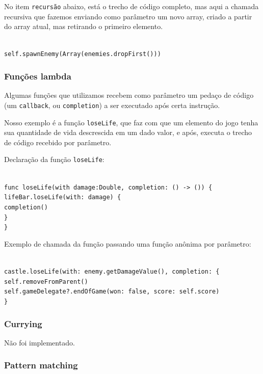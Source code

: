 \documentclass[rel_mlp]{iiufrgs}
\newcommand\tab[1][1cm]{\hspace*{#1}}
\begin{document}
No item \texttt{recursão} abaixo, está o trecho de código completo, mas aqui a chamada recursiva que fazemos enviando como parâmetro um novo array, criado a partir do array atual, mas retirando o primeiro elemento.

\texttt{
\\self.spawnEnemy(Array(enemies.dropFirst()))
}


\subsubsection{Funções lambda}

Algumas funções que utilizamos recebem como parâmetro um pedaço de código (um \texttt{callback}, ou \texttt{completion}) a ser executado após certa instrução.

Nosso exemplo é a função \texttt{loseLife}, que faz com que um elemento do jogo tenha sua quantidade de vida descrescida em um dado valor, e após, executa o trecho de código recebido por parâmetro.

Declaração da função \texttt{loseLife}:

\texttt{
\\func loseLife(with damage:Double, completion: () -> ()) \{
\\\tab lifeBar.loseLife(with: damage) \{
\\\tab\tab completion()
\\\tab \}
\\\}
}

Exemplo de chamada da função passando uma função anônima por parâmetro:

\texttt{
\\castle.loseLife(with: enemy.getDamageValue(), completion: \{
\\\tab self.removeFromParent()
\\\tab self.gameDelegate?.endOfGame(won: false, score: self.score)
\\\}
}


\subsubsection{Currying}

Não foi implementado.


\subsubsection{Pattern matching}
\end{document}
